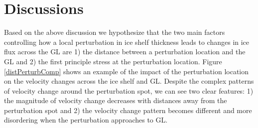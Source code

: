 \documentclass[review,oneside]{igs}
\begin{document}




\section{Discussions}

Based on the above discussion we hypothesize that the two main factors controlling how a local perturbation in ice shelf thickness leads to changes in ice flux across the GL are 1) the distance between a perturbation location and the GL and 2) the first principle stress at the perturbation location. Figure \ref{distPerturbComp} shows an example of the impact of the perturbation location on the velocity changes across the ice shelf and GL. Despite the complex patterns of velocity change around the perturbation spot, we can see two clear features: 1) the magnitude of velocity change decreases with distances away from the perturbation spot and 2) the velocity change pattern becomes different and more disordering when the perturbation  approaches to GL. 
\end{document}
